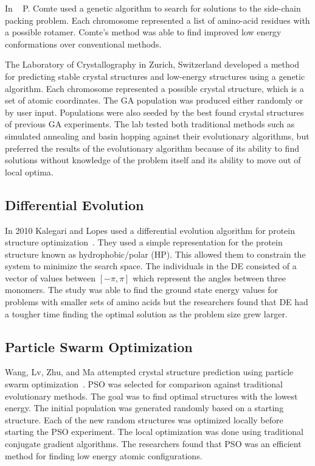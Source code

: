 In ~\cite{comte2010bio} P. Comte used a genetic algorithm to search for solutions to the side-chain packing problem. Each chromosome represented a list of amino-acid residues with a possible rotamer. Comte's method was able to find improved low energy conformations over conventional methods.

The Laboratory of Crystallography in Zurich, Switzerland developed a method~\cite{oganov2006crystal} for predicting stable crystal structures and low-energy structures using a genetic algorithm. Each chromosome represented a possible crystal structure, which is a set of atomic coordinates. The GA population was produced either randomly or by user input. Populations were also seeded by the best found crystal structures of previous GA experiments. The lab tested both traditional methods such as simulated annealing and basin hopping against their evolutionary algorithms, but preferred the results of the evolutionary algorithm because of its ability to find solutions without knowledge of the problem itself and its ability to move out of local optima.

\subsection{Differential Evolution}

In 2010 Kalegari and Lopes used a differential evolution algorithm for protein structure optimization~\cite{kalegari2010differential}. They used a simple representation for the protein structure known as hydrophobic/polar (HP). This allowed them to constrain the system to minimize the search space. The individuals in the DE consisted of a vector of values between $[-\pi, \pi]$ which represent the angles between three monomers. The study was able to find the ground state energy values for problems with smaller sets of amino acids but the researchers found that DE had a tougher time finding the optimal solution as the problem size grew larger.

\subsection{Particle Swarm Optimization}

Wang, Lv, Zhu, and Ma attempted crystal structure prediction using particle swarm optimization~\cite{wang2010crystal}. PSO was selected for comparison against traditional evolutionary methods. The goal was to find optimal structures with the lowest energy. The initial population was generated randomly based on a starting structure. Each of the new random structures was optimized locally before starting the PSO experiment. The local optimization was done using traditional conjugate gradient algorithms. The researchers found that PSO was an efficient method for finding low energy atomic configurations.